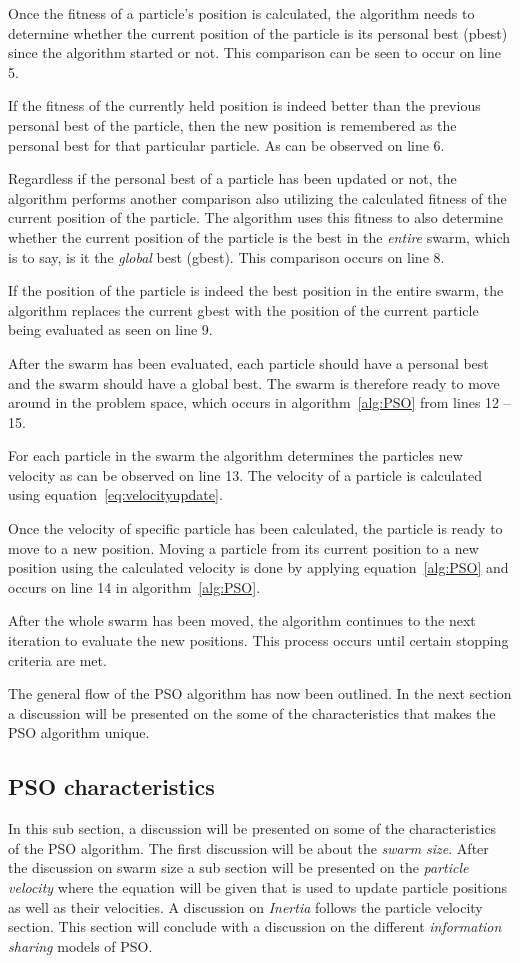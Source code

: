 Once the fitness of a particle's position is calculated, the algorithm needs to determine whether the current position of the particle is its personal best (pbest) since the algorithm started or not. This comparison can be seen to occur on line 5. 

If the fitness of the currently held position is indeed better than the previous personal best of the particle, then the new position is remembered as the personal best for that particular particle. As can be observed on line 6.

Regardless if the personal best of a particle has been updated or not, the algorithm performs another comparison also utilizing the calculated fitness of the current position of the particle. The algorithm uses this fitness to also determine whether the current position of the particle is the best in the \emph{entire} swarm, which is to say, is it the \emph{global} best (gbest). This comparison occurs on line  8.

If the position of the particle is indeed the best position in the entire swarm, the algorithm replaces the current gbest with the position of the current particle being evaluated as seen on line 9.

After the swarm has been evaluated, each particle should have a personal best and the swarm should have a global best. The swarm is therefore ready to move around in the problem space, which occurs in algorithm~\ref{alg:PSO} from lines 12 -- 15.

For each particle in the swarm the algorithm determines the particles new velocity as can be observed on line 13. The velocity of a particle is calculated using equation~\ref{eq:velocityupdate}. 

Once the velocity of specific particle has been calculated, the particle is ready to move to a new position. Moving a particle from its current position to a new position using the calculated velocity is done by applying equation~\ref{alg:PSO} and occurs on line 14 in algorithm~\ref{alg:PSO}.

After the whole swarm has been moved, the algorithm continues to the next iteration to evaluate the new positions. This process occurs until certain stopping criteria are met.

The general flow of the PSO algorithm has now been outlined. In the next section a discussion will be presented on the some of the characteristics that makes the PSO algorithm unique.
\subsection{PSO characteristics}
\label{sec:psocharacteristics}
In this sub section, a discussion will be presented on some of the characteristics of the PSO algorithm. The first discussion will be about the \emph{swarm size}. After the discussion on swarm size a sub section will be presented on the \emph{particle velocity} where the equation will be given that is used to update particle positions as well as their velocities. A discussion on \emph{Inertia} follows the particle velocity section. This section will conclude with a discussion on the different \emph{information sharing} models of PSO.

